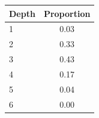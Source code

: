 \begin{tabular}{lc}
\toprule
Depth & Proportion \\
\midrule
1 & 0.03 \\
2 & 0.33 \\
3 & 0.43 \\
4 & 0.17 \\
5 & 0.04 \\
6 & 0.00 \\
\bottomrule
\end{tabular}
